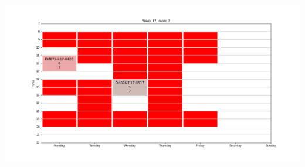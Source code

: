 \documentclass{article}
\begin{document}
    \subsection{}
    \hspace*{-2cm}\includegraphics[scale=0.39]{../images/badslot.png}
\end{document}
